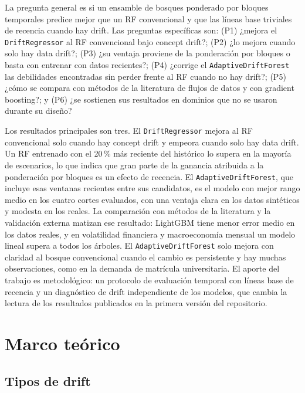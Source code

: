 \documentclass[11pt,a4paper]{article}
\begin{document}
La pregunta general es si un ensamble de bosques ponderado por bloques temporales predice mejor que
un RF convencional y que las líneas base triviales de recencia cuando hay drift. Las preguntas
específicas son: (P1) ¿mejora el \texttt{DriftRegressor} al RF convencional bajo concept drift?; (P2)
¿lo mejora cuando solo hay data drift?; (P3) ¿su ventaja proviene de la ponderación por bloques o
basta con entrenar con datos recientes?; (P4) ¿corrige el \texttt{AdaptiveDriftForest} las
debilidades encontradas sin perder frente al RF cuando no hay drift?; (P5) ¿cómo se compara con
métodos de la literatura de flujos de datos y con gradient boosting?; y (P6) ¿se sostienen sus
resultados en dominios que no se usaron durante su diseño?

Los resultados principales son tres. El \texttt{DriftRegressor} mejora al RF convencional solo cuando
hay concept drift y empeora cuando solo hay data drift. Un RF entrenado con el 20\,\% más reciente del
histórico lo supera en la mayoría de escenarios, lo que indica que gran parte de la ganancia atribuida
a la ponderación por bloques es un efecto de recencia. El \texttt{AdaptiveDriftForest}, que incluye
esas ventanas recientes entre sus candidatos, es el modelo con mejor rango medio en los cuatro cortes
evaluados, con una ventaja clara en los datos sintéticos y modesta en los reales. La comparación con
métodos de la literatura y la validación externa matizan ese resultado: LightGBM tiene menor error medio
en los datos reales, y en volatilidad financiera y macroeconomía mensual un modelo lineal supera a todos
los árboles. El \texttt{AdaptiveDriftForest} solo mejora con claridad al bosque convencional cuando el
cambio es persistente y hay muchas observaciones, como en la demanda de matrícula universitaria. El aporte del
trabajo es metodológico: un protocolo de evaluación temporal con líneas base de recencia y un
diagnóstico de drift independiente de los modelos, que cambia la lectura de los resultados
publicados en la primera versión del repositorio.

\section{Marco teórico}\label{sec:marco}

\subsection{Tipos de drift}
\end{document}
